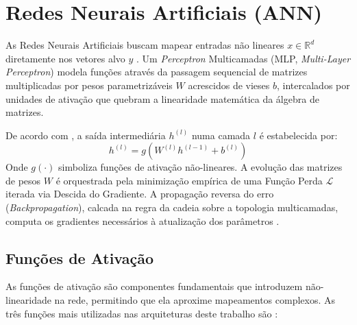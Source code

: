 \section{Redes Neurais Artificiais (ANN)}
As Redes Neurais Artificiais buscam mapear entradas não lineares $x \in \mathbb{R}^d$ diretamente nos vetores alvo $y$ \cite{goodfellow2016deep}. Um \textit{Perceptron} Multicamadas (MLP, \textit{Multi-Layer Perceptron}) modela funções através da passagem sequencial de matrizes multiplicadas por pesos parametrizáveis $W$ acrescidos de vieses $b$, intercalados por unidades de ativação que quebram a linearidade matemática da álgebra de matrizes.

De acordo com \cite{lecun2015deep}, a saída intermediária $h^{(l)}$ numa camada $l$ é estabelecida por:
\begin{equation}
    h^{(l)} = g\left( W^{(l)} h^{(l-1)} + b^{(l)} \right)
\end{equation}
Onde $g(\cdot)$ simboliza funções de ativação não-lineares. A evolução das matrizes de pesos $W$ é orquestrada pela minimização empírica de uma Função Perda $\mathcal{L}$ iterada via Descida do Gradiente. A propagação reversa do erro (\textit{Backpropagation}), calcada na regra da cadeia sobre a topologia multicamadas, computa os gradientes necessários à atualização dos parâmetros \cite{rumelhart1986learning}.

\subsection{Funções de Ativação}
As funções de ativação são componentes fundamentais que introduzem não-linearidade na rede, permitindo que ela aproxime mapeamentos complexos. As três funções mais utilizadas nas arquiteturas deste trabalho são \cite{goodfellow2016deep, nair2010rectified}:

